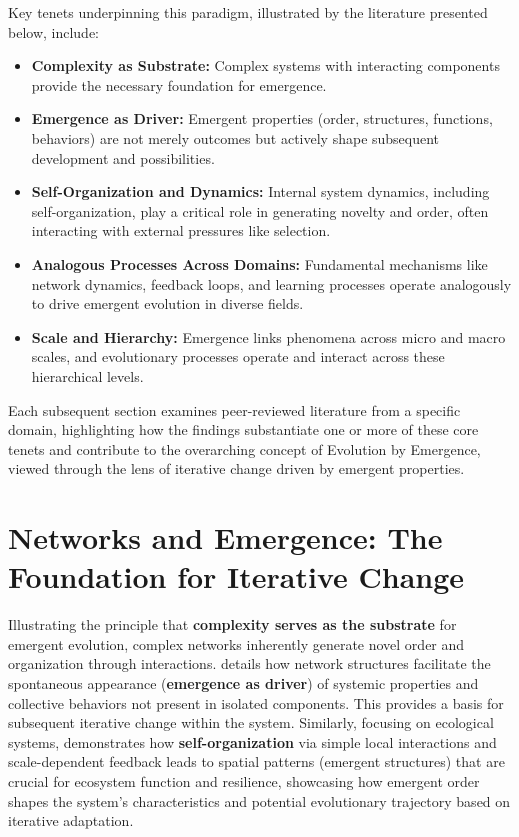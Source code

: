 Key tenets underpinning this paradigm, illustrated by the literature presented below, include:
\begin{itemize}
    \item \textbf{Complexity as Substrate:} Complex systems with interacting components provide the necessary foundation for emergence.
    \item \textbf{Emergence as Driver:} Emergent properties (order, structures, functions, behaviors) are not merely outcomes but actively shape subsequent development and possibilities.
    \item \textbf{Self-Organization and Dynamics:} Internal system dynamics, including self-organization, play a critical role in generating novelty and order, often interacting with external pressures like selection.
    \item \textbf{Analogous Processes Across Domains:} Fundamental mechanisms like network dynamics, feedback loops, and learning processes operate analogously to drive emergent evolution in diverse fields.
    \item \textbf{Scale and Hierarchy:} Emergence links phenomena across micro and macro scales, and evolutionary processes operate and interact across these hierarchical levels.
\end{itemize}

Each subsequent section examines peer-reviewed literature from a specific domain, highlighting how the findings substantiate one or more of these core tenets and contribute to the overarching concept of Evolution by Emergence, viewed through the lens of iterative change driven by emergent properties.

\section{Networks and Emergence: The Foundation for Iterative Change} \label{sec:networks}
Illustrating the principle that \textbf{complexity serves as the substrate} for emergent evolution, complex networks inherently generate novel order and organization through interactions. \citet{green2023emergence} details how network structures facilitate the spontaneous appearance (\textbf{emergence as driver}) of systemic properties and collective behaviors not present in isolated components. This provides a basis for subsequent iterative change within the system. Similarly, focusing on ecological systems, \citet{levin2005self} demonstrates how \textbf{self-organization} via simple local interactions and scale-dependent feedback leads to spatial patterns (emergent structures) that are crucial for ecosystem function and resilience, showcasing how emergent order shapes the system's characteristics and potential evolutionary trajectory based on iterative adaptation.

